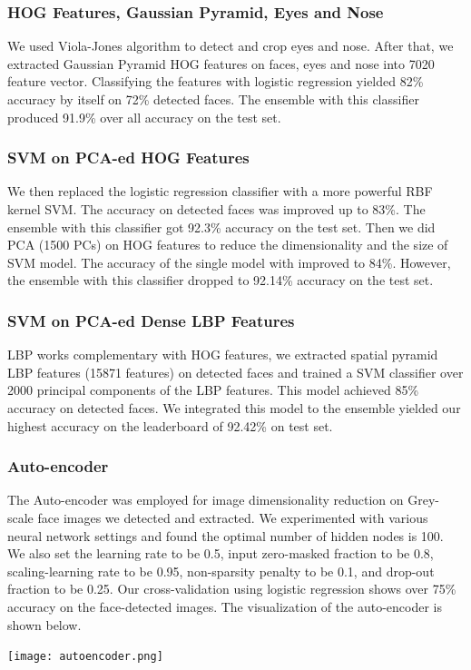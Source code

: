 \subsubsection{HOG Features, Gaussian Pyramid, Eyes and Nose}
We used Viola-Jones algorithm to detect and crop eyes and nose. After that, we extracted Gaussian Pyramid HOG features on faces, eyes and nose into 7020 feature vector. Classifying the features with logistic regression yielded 82\% accuracy by itself on 72\% detected faces. The ensemble with this classifier produced 91.9\% over all accuracy on the test set. 
\subsubsection{SVM on PCA-ed HOG Features}
We then replaced the logistic regression classifier with a more powerful RBF kernel SVM. The accuracy on detected faces was improved up to 83\%. The ensemble with this classifier got 92.3\% accuracy on the test set.  Then we did PCA (1500 PCs) on HOG features to reduce the dimensionality and the size of SVM model. The accuracy of the single model with improved to 84\%. However, the ensemble with this classifier dropped to 92.14\% accuracy on the test set. 
\subsubsection{SVM on PCA-ed Dense LBP Features}
LBP works complementary with HOG features, we extracted spatial pyramid LBP features (15871 features) on detected faces and trained a SVM classifier over 2000 principal components of the LBP features. This model achieved 85\% accuracy on detected faces. We integrated this model to the ensemble yielded our highest accuracy on the leaderboard of 92.42\% on test set.

\subsubsection{Auto-encoder}
The Auto-encoder was employed for image dimensionality reduction on Grey-scale face images we detected and extracted. We experimented with various neural network settings and found the optimal number of hidden nodes is 100. We also set the learning rate to be 0.5, input zero-masked fraction to be 0.8, scaling-learning rate to be 0.95, non-sparsity penalty to be 0.1, and drop-out fraction to be 0.25. Our cross-validation using logistic regression shows over 75\% accuracy on the face-detected images.
The visualization of the auto-encoder is shown below. 
\begin{center}
\texttt{[image: autoencoder.png]}
\end{center}
